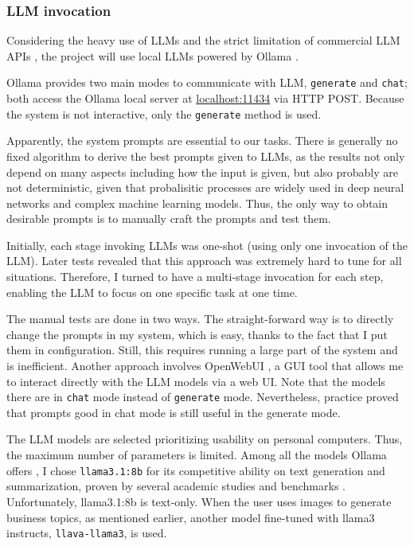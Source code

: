 \documentclass[final-report]{report-template}
\begin{document}
\subsubsection{LLM invocation}
Considering the heavy use of LLMs and the strict limitation of commercial LLM
APIs \cite{openai.api.limit, anthropic.api.limit}, the project will use local
LLMs powered by Ollama \cite{ollama}.

Ollama provides two main modes to communicate with LLM, \texttt{generate} and
\texttt{chat}; both access the Ollama local server at \url{localhost:11434} via
HTTP POST. Because the system is not interactive, only the \texttt{generate}
method is used.

Apparently, the system prompts are essential to our tasks. There is
generally no fixed algorithm to derive the best prompts given to LLMs, as
the results not only depend on many aspects including how the input is
given, but also probably are not deterministic, given that probalisitic
processes are widely used in deep neural networks and complex machine learning
models. Thus, the only way to obtain desirable prompts is to manually craft the
prompts and test them.

Initially, each stage invoking LLMs was one-shot (using only one invocation of
the LLM). Later tests revealed that this approach was extremely hard to tune
for all situations. Therefore, I turned to have a multi-stage invocation for
each step, enabling the LLM to focus on one specific task at one time.

The manual tests are done in two ways. The straight-forward way is to directly
change the prompts in my system, which is easy, thanks to the fact that I
put them in configuration. Still, this requires running a large part of the
system and is inefficient. Another approach involves OpenWebUI
\cite{open.webui}, a GUI tool that allows me to interact directly with the LLM
models via a web UI. Note that the models  there are in \texttt{chat} mode
instead of \texttt{generate} mode. Nevertheless, practice proved that prompts
good in chat mode is still useful in the generate mode.

The LLM models are selected prioritizing usability on personal computers. Thus,
the maximum number of parameters is limited. Among all the models Ollama offers
\cite{ollama.models}, I chose \texttt{llama3.1:8b} for its competitive ability
on text generation and summarization, proven by several academic studies and
benchmarks \cite{llama3.1.bench.1, llama3.1.bench.2, llama3.1.bench.3}.
Unfortunately, llama3.1:8b is text-only. When the user uses images to generate
business topics, as mentioned earlier, another model fine-tuned with llama3
instructs, \texttt{llava-llama3}, is used.
\end{document}
